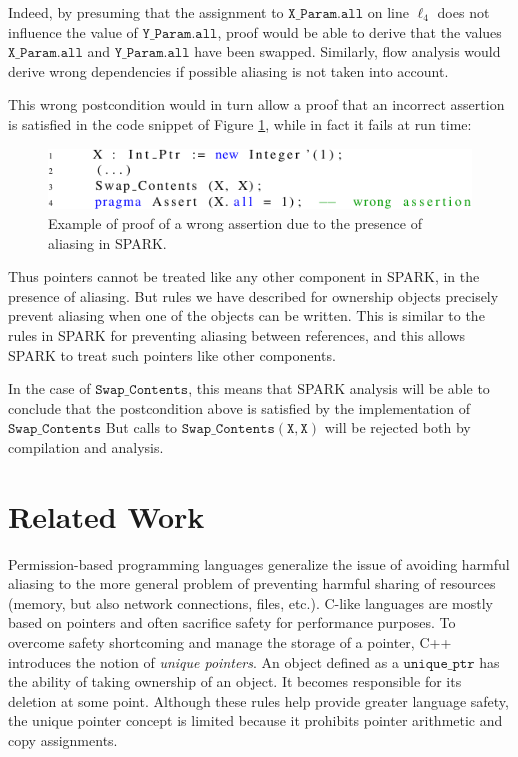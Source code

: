 \documentclass{llncs}
\newcommand\var[1]{\ensuremath{\mathtt{#1}}}
\begin{document}
Indeed, by presuming that the assignment to \var{X\_Param.all} on line $\ell_4$ does not influence the value of \var{Y\_Param.all}, proof would be able to
derive that the values \var{X\_Param.all} and \var{Y\_Param.all} have been swapped. Similarly, flow analysis would derive wrong dependencies if possible aliasing is not taken into account.

This wrong postcondition would in turn allow a proof that an incorrect assertion is satisfied in the code snippet of Figure \ref{fig:spark_ex1_exp}, while in fact it fails at run time:

\begin{figure}[htb!]
\centering
  \captionsetup{justification=centering,margin=0.6cm}
   \includegraphics[]{spark_ex1_exp}
	\caption{Example of proof of a wrong assertion due to the presence of aliasing in SPARK.}
   \label{fig:spark_ex1_exp}
\end{figure}

Thus pointers cannot be treated like any other component in SPARK, in the presence of aliasing. But rules we have described for ownership objects precisely prevent
aliasing when one of the objects can be written. This is similar to the rules in SPARK for preventing aliasing between references, and this allows SPARK to treat such pointers
like other components.

In the case of \var{Swap\_Contents}, this means that SPARK analysis will be able to conclude that the postcondition above is satisfied by the implementation of \var{Swap\_Contents}
But calls to \var{Swap\_Contents(X,X)} will be rejected both by compilation and analysis.


\section{Related Work}

Permission-based programming languages generalize the issue of avoiding harmful aliasing to the more general problem of preventing harmful sharing of resources
(memory, but also network connections, files, etc.). C-like languages are mostly based on pointers and often sacrifice safety for performance purposes.
To overcome safety shortcoming and manage the storage of a pointer, C++ introduces the notion of \textit{unique pointers}. An object defined as a \var{unique\_ptr}
has the ability of taking ownership of an object. It becomes responsible for its deletion at some point. Although these rules help provide greater language safety, the unique
pointer concept is limited because it prohibits pointer arithmetic and copy assignments.
\end{document}
